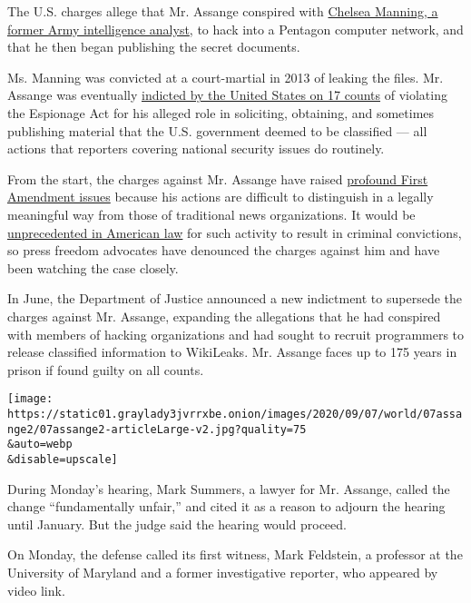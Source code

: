 The U.S. charges allege that Mr. Assange conspired with
\href{https://www.nytimes3xbfgragh.onion/2019/05/09/us/chelsea-manning-jail.html}{Chelsea
Manning, a former Army intelligence analyst}, to hack into a Pentagon
computer network, and that he then began publishing the secret
documents.

Ms. Manning was convicted at a court-martial in 2013 of leaking the
files. Mr. Assange was eventually
\href{https://www.nytimes3xbfgragh.onion/2019/05/23/us/politics/assange-indictment.html}{indicted
by the United States on 17 counts} of violating the Espionage Act for
his alleged role in soliciting, obtaining, and sometimes publishing
material that the U.S. government deemed to be classified --- all
actions that reporters covering national security issues do routinely.

From the start, the charges against Mr. Assange have raised
\href{https://www.nytimes3xbfgragh.onion/2019/04/11/us/politics/assange-indictment.html?action=click\&module=RelatedCoverage\&pgtype=Article\&region=Footer}{profound
First Amendment issues} because his actions are difficult to distinguish
in a legally meaningful way from those of traditional news
organizations. It would be
\href{https://www.nytimes3xbfgragh.onion/2019/05/23/us/politics/assange-indictment.html}{unprecedented
in American law} for such activity to result in criminal convictions, so
press freedom advocates have denounced the charges against him and have
been watching the case closely.

In June, the Department of Justice announced a new indictment to
supersede the charges against Mr. Assange, expanding the allegations
that he had conspired with members of hacking organizations and had
sought to recruit programmers to release classified information to
WikiLeaks. Mr. Assange faces up to 175 years in prison if found guilty
on all counts.

\texttt{[image: https://static01.graylady3jvrrxbe.onion/images/2020/09/07/world/07assange2/07assange2-articleLarge-v2.jpg?quality=75\\\&auto=webp\\\&disable=upscale]}

During Monday's hearing, Mark Summers, a lawyer for Mr. Assange, called
the change ``fundamentally unfair,'' and cited it as a reason to adjourn
the hearing until January. But the judge said the hearing would proceed.

On Monday, the defense called its first witness, Mark Feldstein, a
professor at the University of Maryland and a former investigative
reporter, who appeared by video link.

